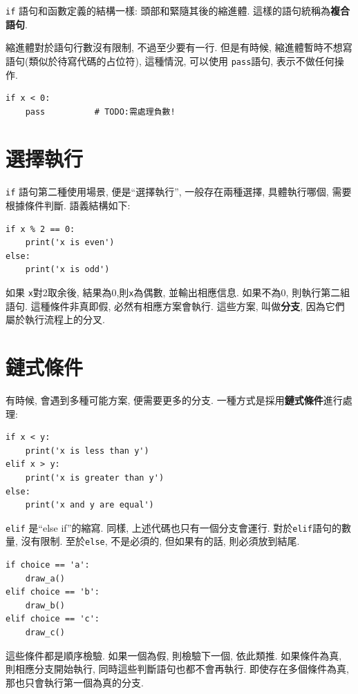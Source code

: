 \documentclass[10pt]{book}
\begin{document}
{\tt if} 語句和函數定義的結構一樣: 頭部和緊隨其後的縮進體. 
這樣的語句統稱為{\bf 複合語句}.

縮進體對於語句行數沒有限制, 不過至少要有一行. 
但是有時候, 縮進體暫時不想寫語句(類似於待寫代碼的占位符), 
這種情況, 可以使用 {\tt pass}語句, 表示不做任何操作.

\begin{verbatim}
if x < 0:
    pass          # TODO:需處理負數!
\end{verbatim}
%

\section{選擇執行}
\label{alternative.execution}
{\tt if} 語句第二種使用場景, 便是``選擇執行'',
一般存在兩種選擇, 具體執行哪個, 需要根據條件判斷. 
語義結構如下:

\begin{verbatim}
if x % 2 == 0:
    print('x is even')
else:
    print('x is odd')
\end{verbatim}
%
如果 {\tt x}對2取余後, 結果為0,則{\tt x}為偶數, 並輸出相應信息. 
如果不為0, 則執行第二組語句. 
這種條件非真即假, 必然有相應方案會執行. 這些方案, 叫做{\bf 分支}, 
因為它們屬於執行流程上的分叉. 



\section{鏈式條件}
有時候, 會遇到多種可能方案, 便需要更多的分支. 
一種方式是採用{\bf 鏈式條件}進行處理:

\begin{verbatim}
if x < y:
    print('x is less than y')
elif x > y:
    print('x is greater than y')
else:
    print('x and y are equal')
\end{verbatim}
%
{\tt elif}  是``else if''的縮寫. 同樣, 上述代碼也只有一個分支會運行. 
對於{\tt elif}語句的數量, 沒有限制. 
至於{\tt else}, 不是必須的, 但如果有的話, 則必須放到結尾.

\begin{verbatim}
if choice == 'a':
    draw_a()
elif choice == 'b':
    draw_b()
elif choice == 'c':
    draw_c()
\end{verbatim}
%
這些條件都是順序檢驗. 如果一個為假, 則檢驗下一個, 依此類推. 
如果條件為真, 則相應分支開始執行, 同時這些判斷語句也都不會再執行. 
即使存在多個條件為真, 那也只會執行第一個為真的分支.  
\end{document}
